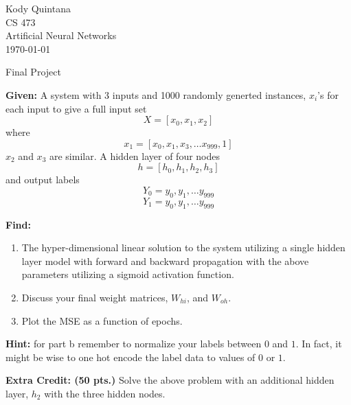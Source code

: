 \documentclass[14pt]{article}
\begin{document}
\begin{flushleft}
 
\large
Kody Quintana\\
CS 473\\
Artificial Neural Networks\\
\today\\
\boldmath

\begin{center}
Final Project
\end{center}

\question
\textbf{Given:}
	A system with 3 inputs and 1000 randomly generted instances, $x_i$'s
	for each input to give a full input set
	\[X = [x_0, x_1, x_2] \]
	where
	\[x_1 = [x_0, x_1, x_3, \ldots x_{999}, 1]\]
	$x_2$ and $x_3$ are similar.
	A hidden layer of four nodes
	\[h = [h_0, h_1, h_2, h_3]\]
	and output labels
	\[Y_0 = y_0, y_1, \ldots y_{999}\]
	\[Y_1 = y_0, y_1, \ldots y_{999}\]
	
\textbf{Find:}
	\begin{enumerate}
	\item The hyper-dimensional linear solution to the system utilizing a single hidden layer model
		with forward and backward propagation with the above parameters
		utilizing a sigmoid activation function.
	\item Discuss your final weight matrices, $W_{hi}$, and $W_{oh}$.
	\item Plot the MSE as a function of epochs.
	\end{enumerate}

\textbf{Hint:}
	for part b remember to normalize your labels between $0$ and $1$.
	In fact, it might be wise to one hot encode the label data to values of $0$ or $1$.
\closequestion

\question
\textbf{Extra Credit: (50 pts.)}
	Solve the above problem with an additional hidden layer, $h_2$ with the three hidden nodes.
\closequestion
		

\end{flushleft}
\end{document}
